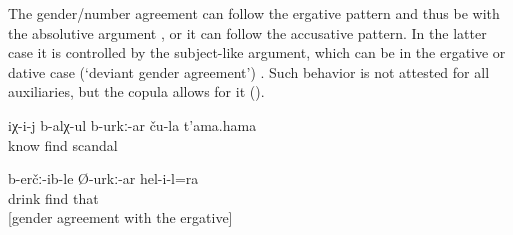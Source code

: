 The gender/number agreement can follow the ergative pattern and thus be with the absolutive argument , or it can follow the accusative pattern. In the latter case it is controlled by the subject-like argument, which can be in the ergative or dative case (`deviant gender agreement') . Such behavior is not attested for all auxiliaries, but the copula allows for it ().
%
\begin{exe}
	\ex	\label{ex:He probably knows their scandal@19}
	\gll	iχ-i-j	b-alχ-ul	b-urkː-ar	ču-la	t'ama.hama\\
			know	find		scandal\\
	\glt	{}

	\ex	\label{ex:He also drank probably agreement with ergative@18}
	\gll	b-erčː-ib-le	Ø-urkː-ar	hel-i-l=ra\\
		drink	find		that\\
	\glt	{} [gender agreement with the ergative]
\end{exe}

